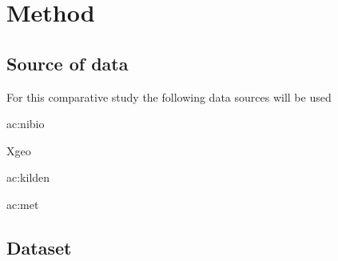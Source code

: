 \section{Method}

\subsection{Source of data}

For this comparative study the following data sources will be used

\begin{enumerate*}
	\item \gls{ac:nibio}
	\item Xgeo
	\item \gls{ac:kilden}
	\item \gls{ac:met}
\end{enumerate*}

\subsection{Dataset}

